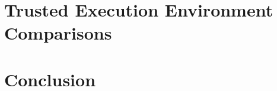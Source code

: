 \documentclass[12pt,oneside,letterpaper,hidelinks]{PSUreport}
\begin{document}
\glsresetall
\chapter{Trusted Execution Environment Comparisons}
\label{chap:comp}


\glsresetall
\chapter{Conclusion}
\label{chap:fini}




\end{document}

